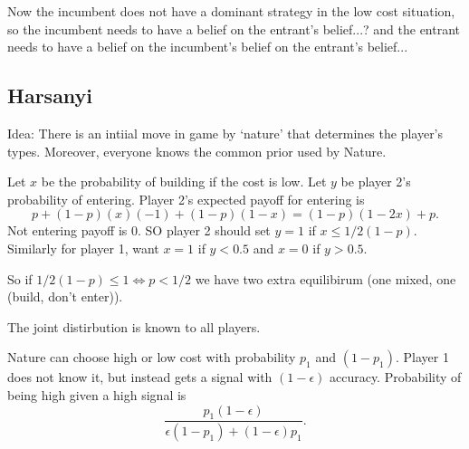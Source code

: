 Now the incumbent does not have a dominant strategy in the low cost situation, so the incumbent needs to have a belief on the entrant's belief...? and the entrant needs to have a belief on the incumbent's belief on the entrant's belief... 

\subsection*{Harsanyi}

Idea: There is an intiial move in game by `nature' that determines the player's types. Moreover, everyone knows the common prior used by Nature. 
\begin{center}
    \end{center}

Let $x$ be the probability of building if the cost is low. Let $y$ be player 2's probability of entering.
Player 2's expected payoff for entering is \[
p +(1-p)(x)(-1)+ (1-p)(1-x) = (1-p)(1-2x)+p.
\]
Not entering payoff is $0$.
SO player 2 should set $y=1$ if $x\leq 1/2(1-p)$.
Similarly for player 1, want $x=1$ if $y<0.5$ and $x=0$ if $y>0.5$.

So if $1/2(1-p)\leq 1\iff p<1/2$ we have two extra equilibirum (one mixed, one (build, don't enter)).


\begin{remark}
    The joint distirbution is known to all players. 
\end{remark}
\begin{aexample}{}{}
    Nature can choose high or low cost with probability $p_1$ and $(1-p_1)$. Player 1 does not know it, but instead gets a signal with $(1-\epsilon)$ accuracy.
    Probability of being high given a high signal is \[
    \frac{p_1(1-\epsilon)}{\epsilon (1-p_1) + (1-\epsilon)p_1}.
    \]
\end{aexample}


